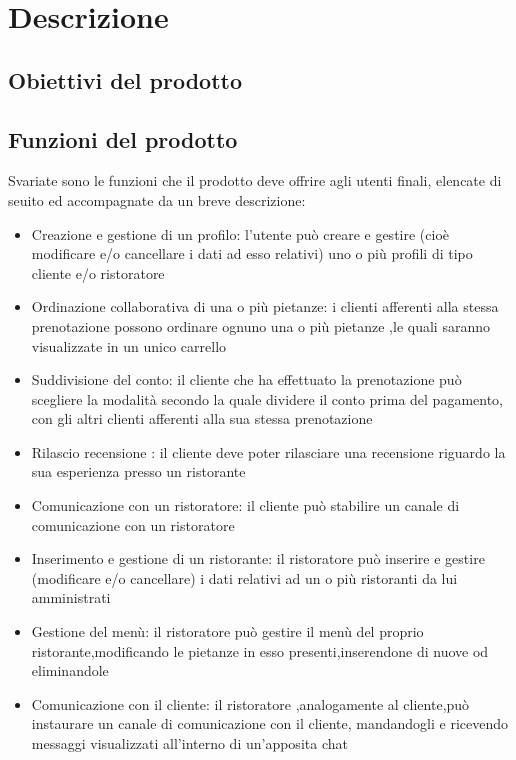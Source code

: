 \section{Descrizione }
\subsection{Obiettivi del prodotto}
\subsection{Funzioni del prodotto}

Svariate sono le funzioni che il prodotto deve offrire agli utenti finali,
elencate di seuito ed accompagnate da un breve descrizione:

\begin{itemize}
    \item Creazione e gestione di un profilo: l'utente può creare e gestire (cioè modificare e/o 
    cancellare i dati ad esso relativi) uno o più profili di tipo cliente e/o ristoratore
    \item Ordinazione collaborativa di una o più pietanze: i clienti afferenti alla stessa prenotazione
    possono ordinare ognuno una o più pietanze ,le quali saranno visualizzate in un unico carrello 
    \item Suddivisione del conto: il cliente che ha effettuato la prenotazione può scegliere la modalità secondo la quale 
    dividere il conto prima del pagamento, con gli altri clienti afferenti alla sua stessa prenotazione
    \item Rilascio recensione : il cliente deve poter rilasciare una recensione riguardo la sua
    esperienza presso un ristorante
    \item Comunicazione con un ristoratore: il cliente può stabilire un canale di comunicazione con un
    ristoratore
    \item Inserimento e gestione di un ristorante: il ristoratore può inserire e gestire (modificare e/o cancellare)
    i dati relativi ad un o più ristoranti da lui amministrati 
    \item Gestione del menù: il ristoratore può gestire il menù del proprio ristorante,modificando le pietanze in esso 
    presenti,inserendone di nuove od eliminandole
    \item Comunicazione con il cliente: il ristoratore ,analogamente al cliente,può instaurare un canale di comunicazione
    con il cliente, mandandogli e ricevendo messaggi visualizzati all'interno di un'apposita chat

\end{itemize}
